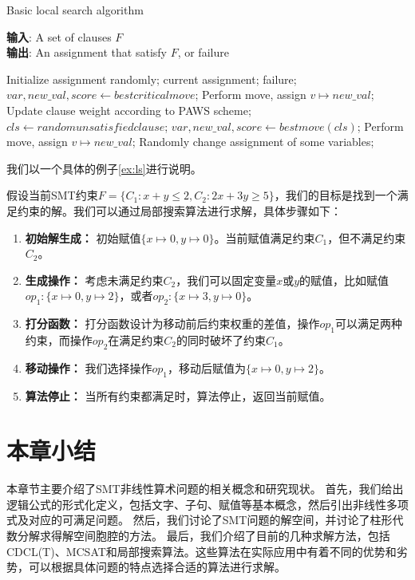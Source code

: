 \begin{algorithm}[t]
    \caption{Basic local search algorithm}
    \label{alg:basic}
    \textbf{输入}: A set of clauses $F$\\
    \textbf{输出}: An assignment that satisfy $F$, or failure\\
    
    \begin{algorithmic}[1] %
        \Statex \hrulefill
        \STATE Initialize assignment randomly;
        \While{\top}
                \RETURN current assignment;
            \ENDIF
                \RETURN failure;
            \ENDIF
            \STATE $var, new\_val, score \leftarrow best critical move$;
                Perform move, assign $v \mapsto new\_val$;
            \ELSE
                \STATE Update clause weight according to PAWS scheme;
                \STATE $cls \leftarrow random unsatisfied clause$;
                \STATE $var, new\_val, score \leftarrow best move(cls)$;
                    Perform move, assign $v \mapsto new\_val$;
                \ENDIF
                \STATE Randomly change assignment of some variables;
                \ENDIF
            \ENDIF
        \EndWhile
    \end{algorithmic}
\end{algorithm}

我们以一个具体的例子\ref{ex:ls}进行说明。
\begin{example}
    假设当前SMT约束$F = \{C_1: x + y \leq 2, C_2: 2x + 3y \geq 5\}$，我们的目标是找到一个满足约束的解。我们可以通过局部搜索算法进行求解，具体步骤如下：

    \begin{enumerate}
        \item \textbf{初始解生成：} 初始赋值$\{x \mapsto 0, y \mapsto 0\}$。当前赋值满足约束$C_1$，但不满足约束$C_2$。
        \item \textbf{生成操作：} 考虑未满足约束$C_2$，我们可以固定变量$x$或$y$的赋值，比如赋值$op_1: \{x \mapsto 0, y \mapsto 2\}$，或者$op_2: \{x \mapsto 3, y \mapsto 0\}$。
        \item \textbf{打分函数：} 打分函数设计为移动前后约束权重的差值，操作$op_1$可以满足两种约束，而操作$op_2$在满足约束$C_2$的同时破坏了约束$C_1$。
        \item \textbf{移动操作：} 我们选择操作$op_1$，移动后赋值为$\{x \mapsto 0, y \mapsto 2\}$。
        \item \textbf{算法停止：} 当所有约束都满足时，算法停止，返回当前赋值。
    \end{enumerate}
\label{ex:ls}
\end{example}


\section{本章小结}

本章节主要介绍了SMT非线性算术问题的相关概念和研究现状。
首先，我们给出逻辑公式的形式化定义，包括文字、子句、赋值等基本概念，然后引出非线性多项式及对应的可满足问题。
然后，我们讨论了SMT问题的解空间，并讨论了柱形代数分解求得解空间胞腔的方法。
最后，我们介绍了目前的几种求解方法，包括CDCL(T)、MCSAT和局部搜索算法。这些算法在实际应用中有着不同的优势和劣势，可以根据具体问题的特点选择合适的算法进行求解。